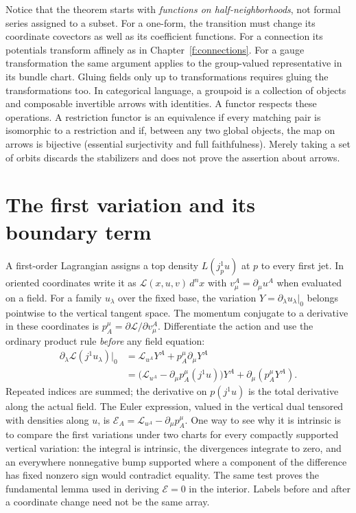 Notice that the theorem starts with \emph{functions on half-neighborhoods}, not formal series assigned to a subset. For a one-form, the transition must change its coordinate covectors as well as its coefficient functions. For a connection its potentials transform affinely as in Chapter~\ref{f:connections}. For a gauge transformation the same argument applies to the group-valued representative in its bundle chart. Gluing fields only up to transformations requires gluing the transformations too. In categorical language, a groupoid is a collection of objects and composable invertible arrows with identities. A functor respects these operations. A restriction functor is an equivalence if every matching pair is isomorphic to a restriction and if, between any two global objects, the map on arrows is bijective (essential surjectivity and full faithfulness). Merely taking a set of orbits discards the stabilizers and does not prove the assertion about arrows.

\section{The first variation and its boundary term}\label{f:first-variation}
A first-order Lagrangian assigns a top density $L(j_p^1u)$ at $p$ to every first jet. In oriented coordinates write it as $\mathcal L(x,u,v)\,d^nx$ with $v^A_\mu=\partial_\mu u^A$ when evaluated on a field. For a family $u_\lambda$ over the fixed base, the variation $Y=\partial_\lambda u_\lambda|_0$ belongs pointwise to the vertical tangent space. The momentum conjugate to a derivative in these coordinates is $p_A^\mu=\partial\mathcal L/\partial v^A_\mu$. Differentiate the action and use the ordinary product rule \emph{before} any field equation:
\begin{align*}
 \partial_\lambda \mathcal L(j^1u_\lambda)|_0
 &=\mathcal L_{u^A}Y^A+p_A^\mu\partial_\mu Y^A\\
 &=\big(\mathcal L_{u^A}-\partial_\mu p_A^\mu(j^1u)\big)Y^A
       +\partial_\mu(p_A^\mu Y^A).
\end{align*}
Repeated indices are summed; the derivative on $p(j^1u)$ is the total derivative along the actual field. The Euler expression, valued in the vertical dual tensored with densities along $u$, is $\mathcal E_A=\mathcal L_{u^A}-\partial_\mu p_A^\mu$. One way to see why it is intrinsic is to compare the first variations under two charts for every compactly supported vertical variation: the integral is intrinsic, the divergences integrate to zero, and an everywhere nonnegative bump supported where a component of the difference has fixed nonzero sign would contradict equality. The same test proves the fundamental lemma used in deriving $\mathcal E=0$ in the interior. Labels before and after a coordinate change need not be the same array.

